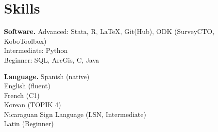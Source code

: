 \documentclass[a4paper, 10pt]{article}
\renewenvironment{itemize}{
  \begin{list}{}
    { \setlength{\itemsep}{5pt}
      \setlength{\parsep}{0pt}
      \setlength{\topsep}{0pt}
      \setlength{\leftmargin}{0em} } }{
  \end{list}}
\begin{document}
\section*{Skills}
\begin{itemize}
\item \textbf{Software.} \newline Advanced: Stata, R, \LaTeX, Git(Hub), ODK
(SurveyCTO, KoboToolbox) \\
Intermediate: Python \\
Beginner: SQL, ArcGis, C, Java
\item \textbf{Language.} \newline Spanish (native) \\ English (fluent) \\ French
(C1) \\ Korean (TOPIK 4) \\ Nicaraguan Sign Language (LSN, Intermediate) \\ Latin
(Beginner)
\end{itemize}
\bigskip


\end{document}
